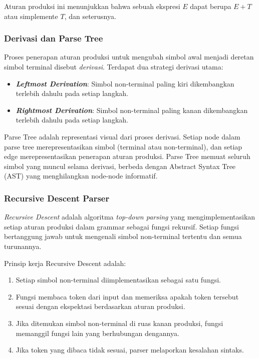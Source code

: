 \documentclass[12pt,a4paper]{article}
\begin{document}
Aturan produksi ini menunjukkan bahwa sebuah ekspresi $E$ dapat berupa $E + T$ atau simplemente $T$, dan seterusnya.

\subsubsection{Derivasi dan Parse Tree}

Proses penerapan aturan produksi untuk mengubah simbol awal menjadi deretan simbol terminal disebut \textit{derivasi}. Terdapat dua strategi derivasi utama:
\begin{itemize}
    \item \textbf{\textit{Leftmost Derivation}}: Simbol non-terminal paling kiri dikembangkan terlebih dahulu pada setiap langkah.
    \item \textbf{\textit{Rightmost Derivation}}: Simbol non-terminal paling kanan dikembangkan terlebih dahulu pada setiap langkah.
\end{itemize}

Parse Tree adalah representasi visual dari proses derivasi. Setiap node dalam
parse tree merepresentasikan simbol (terminal atau non-terminal), dan setiap
edge merepresentasikan penerapan aturan produksi. Parse Tree memuat seluruh
simbol yang muncul selama derivasi, berbeda dengan Abstract Syntax Tree (AST)
yang menghilangkan node-node informatif.

\subsubsection{Recursive Descent Parser}

\textit{Recursive Descent} adalah algoritma \textit{top-down parsing} yang
mengimplementasikan setiap aturan produksi dalam grammar sebagai fungsi
rekursif. Setiap fungsi bertanggung jawab untuk mengenali simbol non-terminal
tertentu dan semua turunannya.

Prinsip kerja Recursive Descent adalah:
\begin{enumerate}
    \item Setiap simbol non-terminal diimplementasikan sebagai satu fungsi.
    \item Fungsi membaca token dari input dan memeriksa apakah token tersebut
        sesuai dengan ekspektasi berdasarkan aturan produksi.
    \item Jika ditemukan simbol non-terminal di ruas kanan produksi, fungsi
        memanggil fungsi lain yang berhubungan dengannya.
    \item Jika token yang dibaca tidak sesuai, parser melaporkan kesalahan sintaks.
\end{enumerate}
\end{document}
